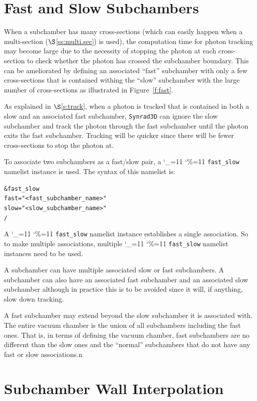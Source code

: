 \documentclass[11pt,openany]{report}
\newcommand{\sref}[1]{$\S$\ref{#1}}
\newcommand{\srthree}{\texttt{Synrad3D}\xspace}
\newcommand\ttcmd{\begingroup\catcode`\_=11 \catcode`\%=11 \dottcmd}
\newcommand\dottcmd[1]{\texttt{#1}\endgroup}
\newcommand{\fig}[1]{Figure~\ref{#1}}
\newcommand{\vn}{\ttcmd}
\newlength{\ExBeg}
\newlength{\ExEnd}
\newenvironment{example}
  {\vspace{\ExBeg} \begin{alltt}}
  {\end{alltt} \vspace{\ExEnd}}
\begin{document}
\section{Fast and Slow Subchambers}
\label{s:fast}

When a subchamber has many cross-sections (which can easily happen when a multi-section
(\sref{ss:multi.sec}) is used), the computation time for photon tracking may become large
due to the necessity of stopping the photon at each cross-section to check whether the
photon has crossed the subchamber boundary. This can be ameliorated by defining an
associated ``fast'' subchamber with only a few cross-sections that is contained withing
the ``slow'' subchamber with the large number of cross-sections as illustrated in
\fig{f:fast}.

As explained in \sref{s:track}, when a photon is tracked that is contained in both a slow
and an associated fast subchamber, \srthree can ignore the slow subchamber and track the
photon through the fast subchamber until the photon exits the fast subchamber. Tracking
will be quicker since there will be fewer cross-sections to stop the photon at.

To associate two subchambers as a fast/slow pair, a \vn{fast_slow} namelist instance is used.
The syntax of this namelist is:
\begin{example}
  &fast_slow
    fast = "<fast_subchamber_name>"
    slow = "<slow_subchamber_name>"
  /
\end{example}
A \vn{fast_slow} namelist instance establishes a single association. So to make multiple
associations, multiple \vn{fast_slow} namelist instances need to be used.

A subchamber can have multiple associated slow or fast subchambers. A subchamber can also
have an associated fast subchamber and an associated slow subchamber although in practice
this is to be avoided since it will, if anything, slow down tracking.

A fast subchamber may extend beyond the slow subchamber it is associated with. The entire
vacuum chamber is the union of all subchambers including the fast ones. That is, in terms
of defining the vacuum chamber, fast subchambers are no different than the slow ones and
the ``normal'' subchambers that do not have any fast or slow associations.n

\section{Subchamber Wall Interpolation} 
\label{s:wall}
\end{document}

